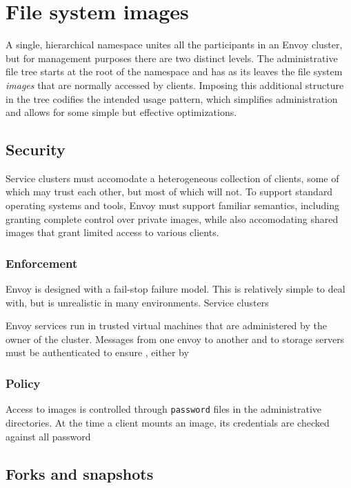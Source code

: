 \section{File system images}

A single, hierarchical namespace unites all the participants in an Envoy cluster, but for management purposes there are two distinct levels. The administrative file tree starts at the root of the namespace and has as its leaves the file system \emph{images} that are normally accessed by clients. Imposing this additional structure in the tree codifies the intended usage pattern, which simplifies administration and allows for some simple but effective optimizations.

\subsection{Security}

Service clusters must accomodate a heterogeneous collection of clients, some of which may trust each other, but most of which will not. To support standard operating systems and tools, Envoy must support familiar semantics, including granting complete control over private images, while also accomodating shared images that grant limited access to various clients.

\subsubsection{Enforcement}

Envoy is designed with a fail-stop failure model. This is relatively simple to deal with, but is unrealistic in many environments. Service clusters 

Envoy services run in trusted virtual machines that are administered by the owner of the cluster. Messages from one envoy to another and to storage servers must be authenticated to ensure , either by  
\subsubsection{Policy}

Access to images is controlled through \texttt{password} files in the administrative directories. At the time a client mounts an image, its credentials are checked against all password 


\subsection{Forks and snapshots}

